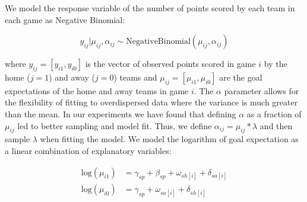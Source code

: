 We model the response variable of the number of points scored by each team in each game as Negative Binomial:

\begin{equation} \label{eq:likelihood}
y_{ij} | \mu_{ij}, \alpha_{ij} \sim \text{NegativeBinomial}(\mu_{ij}, \alpha_{ij})
\end{equation}

where \(y_{ij} = [y_{i1}, y_{i0}]\) is the vector of observed points scored in game \(i\) by the home (\(j=1\)) and away (\(j=0\)) teams and \(\mu_{ij} = [\mu_{i1}, \mu_{i0}]\) are the goal expectations of the home and away teams in game \(i\). The \(\alpha\) parameter allows for the flexibility of fitting to overdispersed data where the variance is much greater than the mean. In our experiments we have found that defining \(\alpha\) as a fraction of \(\mu_{ij}\) led to better sampling and model fit. Thus, we define \(\alpha_{ij} = \mu_{ij} * \lambda\) and then sample \(\lambda\) when fitting the model. We model the logarithm of goal expectation as a linear combination of explanatory variables:

\begin{equation} \label{eq:expected points}
\begin{split}
\text{log}(\mu_{i1}) &= \gamma_{sp} + \beta_{sp} + \omega_{sh[i]} + \delta_{sa[i]} \\
\text{log}(\mu_{i0}) &= \gamma_{sp} + \omega_{sa[i]} + \delta_{sh[i]}
\end{split}
\end{equation}

